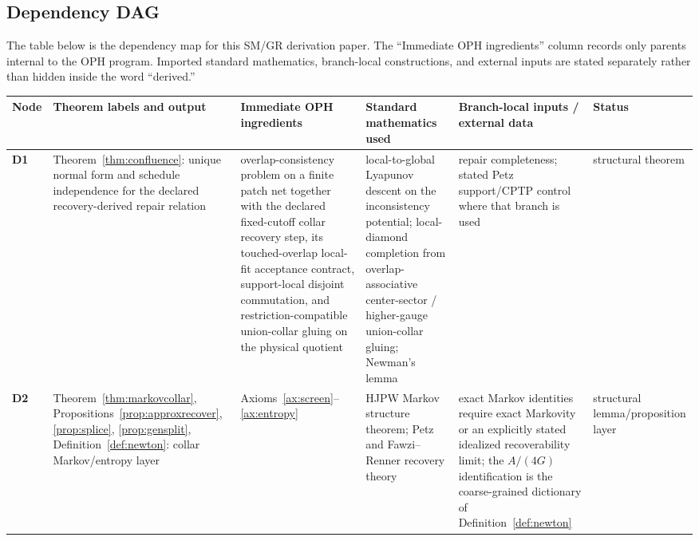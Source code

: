 \documentclass[11pt]{article}
\begin{document}
\subsection*{Dependency DAG}

The table below is the dependency map for this SM/GR derivation paper. The ``Immediate OPH ingredients'' column records only parents internal to the OPH program. Imported standard mathematics, branch-local constructions, and external inputs are stated separately rather than hidden inside the word ``derived.''

\begingroup
\scriptsize
\setlength{\tabcolsep}{1pt}
\begin{longtable}{@{}>{\raggedright\arraybackslash}p{}>{\raggedright\arraybackslash}p{}>{\raggedright\arraybackslash}p{}>{\raggedright\arraybackslash}p{}>{\raggedright\arraybackslash}p{}>{\raggedright\arraybackslash}p{}@{}}
\toprule
Node & Theorem labels and output & Immediate OPH ingredients & Standard mathematics used & Branch-local inputs / external data & Status \\
\midrule
\endhead
\bottomrule
\endfoot
\textbf{D1} & Theorem~\ref{thm:confluence}: unique normal form and schedule independence for the declared recovery-derived repair relation & overlap-consistency problem on a finite patch net together with the declared fixed-cutoff collar recovery step, its touched-overlap local-fit acceptance contract, support-local disjoint commutation, and restriction-compatible union-collar gluing on the physical quotient & local-to-global Lyapunov descent on the inconsistency potential; local-diamond completion from overlap-associative center-sector / higher-gauge union-collar gluing; Newman's lemma & repair completeness; stated Petz support/CPTP control where that branch is used & structural theorem \\
\textbf{D2} & Theorem~\ref{thm:markovcollar}, Propositions~\ref{prop:approxrecover}, \ref{prop:splice}, \ref{prop:gensplit}, Definition~\ref{def:newton}: collar Markov/entropy layer & Axioms~\ref{ax:screen}--\ref{ax:entropy} & HJPW Markov structure theorem; Petz and Fawzi--Renner recovery theory & exact Markov identities require exact Markovity or an explicitly stated idealized recoverability limit; the \(A/(4G)\) identification is the coarse-grained dictionary of Definition~\ref{def:newton} & structural lemma/\newline proposition layer \\

\end{longtable}
\end{document}
